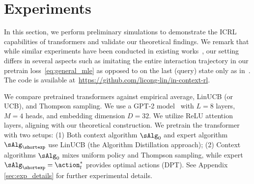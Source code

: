 \documentclass[10pt]{article}
\newcommand{\authnote}[2]{{\scriptsize $\ll$\textsf{#1 notes: #2}$\gg$}}
\newcommand{\authnote}[2]{}
\newcommand{\lc}[1]{{\color{blue}\authnote{Licong}{#1}}}
\begin{document}
\section{Experiments}
\label{sec:experiments}




In this section, we perform preliminary simulations to demonstrate the ICRL capabilities of transformers and validate our theoretical findings. We remark that while similar experiments have been conducted in existing works~\citep{laskin2022context,lee2023supervised}, our setting differs in several aspects such as imitating the entire interaction trajectory in our pretrain loss~\eqref{eq:general_mle} as opposed to on the last (query) state only as in~\citet{lee2023supervised}. The code is available at~\href{https://github.com/licong-lin/in-context-rl}{https://github.com/licong-lin/in-context-rl}.




We compare pretrained transformers against empirical average, LinUCB (or UCB), and Thompson sampling. We use a GPT-2 model~\cite{garg2022can,lee2023supervised} with $L = 8$ layers, $M=4$ heads, and embedding dimension $D=32$. We utilize ReLU attention layers, aligning with our theoretical construction. We pretrain the transformer with two setups: (1) Both context algorithm $\sAlg_0$ and expert algorithm $\sAlg_{\shortexp}$ use LinUCB (the Algorithm Distillation approach); (2) Context algorithms $\sAlg_0$ mixes uniform policy and Thompson sampling, while expert $\sAlg_{\shortexp} = \action_t^*$ provides optimal actions (DPT). See Appendix \ref{sec:exp_details} for further experimental details. 

\end{document}
